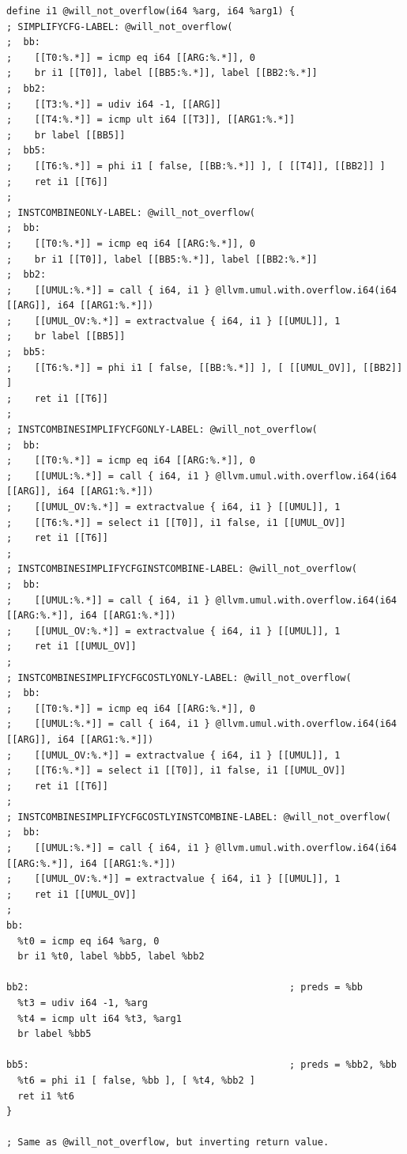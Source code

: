\documentclass[a4paper]{exam}
\theoremstyle{definition}
\begin{document}
\begin{verbatim}
define i1 @will_not_overflow(i64 %arg, i64 %arg1) {
; SIMPLIFYCFG-LABEL: @will_not_overflow(
;  bb:
;    [[T0:%.*]] = icmp eq i64 [[ARG:%.*]], 0
;    br i1 [[T0]], label [[BB5:%.*]], label [[BB2:%.*]]
;  bb2:
;    [[T3:%.*]] = udiv i64 -1, [[ARG]]
;    [[T4:%.*]] = icmp ult i64 [[T3]], [[ARG1:%.*]]
;    br label [[BB5]]
;  bb5:
;    [[T6:%.*]] = phi i1 [ false, [[BB:%.*]] ], [ [[T4]], [[BB2]] ]
;    ret i1 [[T6]]
;
; INSTCOMBINEONLY-LABEL: @will_not_overflow(
;  bb:
;    [[T0:%.*]] = icmp eq i64 [[ARG:%.*]], 0
;    br i1 [[T0]], label [[BB5:%.*]], label [[BB2:%.*]]
;  bb2:
;    [[UMUL:%.*]] = call { i64, i1 } @llvm.umul.with.overflow.i64(i64 [[ARG]], i64 [[ARG1:%.*]])
;    [[UMUL_OV:%.*]] = extractvalue { i64, i1 } [[UMUL]], 1
;    br label [[BB5]]
;  bb5:
;    [[T6:%.*]] = phi i1 [ false, [[BB:%.*]] ], [ [[UMUL_OV]], [[BB2]] ]
;    ret i1 [[T6]]
;
; INSTCOMBINESIMPLIFYCFGONLY-LABEL: @will_not_overflow(
;  bb:
;    [[T0:%.*]] = icmp eq i64 [[ARG:%.*]], 0
;    [[UMUL:%.*]] = call { i64, i1 } @llvm.umul.with.overflow.i64(i64 [[ARG]], i64 [[ARG1:%.*]])
;    [[UMUL_OV:%.*]] = extractvalue { i64, i1 } [[UMUL]], 1
;    [[T6:%.*]] = select i1 [[T0]], i1 false, i1 [[UMUL_OV]]
;    ret i1 [[T6]]
;
; INSTCOMBINESIMPLIFYCFGINSTCOMBINE-LABEL: @will_not_overflow(
;  bb:
;    [[UMUL:%.*]] = call { i64, i1 } @llvm.umul.with.overflow.i64(i64 [[ARG:%.*]], i64 [[ARG1:%.*]])
;    [[UMUL_OV:%.*]] = extractvalue { i64, i1 } [[UMUL]], 1
;    ret i1 [[UMUL_OV]]
;
; INSTCOMBINESIMPLIFYCFGCOSTLYONLY-LABEL: @will_not_overflow(
;  bb:
;    [[T0:%.*]] = icmp eq i64 [[ARG:%.*]], 0
;    [[UMUL:%.*]] = call { i64, i1 } @llvm.umul.with.overflow.i64(i64 [[ARG]], i64 [[ARG1:%.*]])
;    [[UMUL_OV:%.*]] = extractvalue { i64, i1 } [[UMUL]], 1
;    [[T6:%.*]] = select i1 [[T0]], i1 false, i1 [[UMUL_OV]]
;    ret i1 [[T6]]
;
; INSTCOMBINESIMPLIFYCFGCOSTLYINSTCOMBINE-LABEL: @will_not_overflow(
;  bb:
;    [[UMUL:%.*]] = call { i64, i1 } @llvm.umul.with.overflow.i64(i64 [[ARG:%.*]], i64 [[ARG1:%.*]])
;    [[UMUL_OV:%.*]] = extractvalue { i64, i1 } [[UMUL]], 1
;    ret i1 [[UMUL_OV]]
;
bb:
  %t0 = icmp eq i64 %arg, 0
  br i1 %t0, label %bb5, label %bb2

bb2:                                              ; preds = %bb
  %t3 = udiv i64 -1, %arg
  %t4 = icmp ult i64 %t3, %arg1
  br label %bb5

bb5:                                              ; preds = %bb2, %bb
  %t6 = phi i1 [ false, %bb ], [ %t4, %bb2 ]
  ret i1 %t6
}

; Same as @will_not_overflow, but inverting return value.


\end{verbatim}
\end{document}
